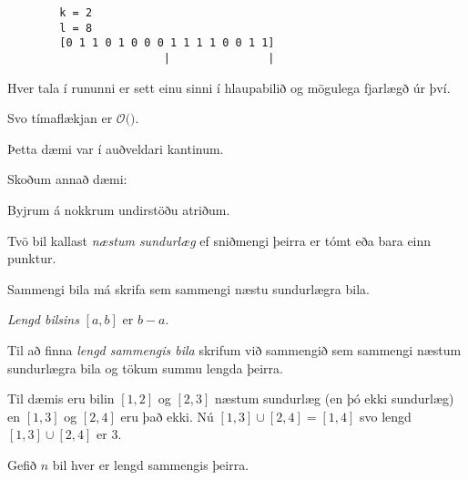 { \begin{verbatim}
        k = 2
        l = 8
        [0 1 1 0 1 0 0 0 1 1 1 1 0 0 1 1]
                        |               |
\end{verbatim} }

{
	\only<all:1>{\hbilA}
	\only<all:2>{\hbilB}
	\only<all:3>{\hbilC}
	\only<all:4>{\hbilD}
	\only<all:5>{\hbilE}
	\only<all:6>{\hbilF}
	\only<all:7>{\hbilG}
	\only<all:8>{\hbilH}
	\only<all:9>{\hbilI}
	\only<all:10>{\hbilJ}
	\only<all:11>{\hbilK}
	\only<all:12>{\hbilL}
	\only<all:13>{\hbilM}
	\only<all:14>{\hbilN}
	\only<all:15>{\hbilO}
	\only<all:16>{\hbilP}
	\only<all:17>{\hbilQ}
	\only<all:18>{\hbilR}
	\only<all:19>{\hbilS}
	\only<all:20>{\hbilT}
	\only<all:21>{\hbilU}
	\only<all:22>{\hbilV}
	\only<all:23>{\hbilW}
	\only<all:24>{\hbilX}
	\only<all:25>{\hbilY}
}

{
}

{
	{
		\item<1-> Hver tala í rununni er sett einu sinni í hlaupabilið og mögulega fjarlægð úr því.
		\item<2-> Svo tímaflækjan er $\mathcal{O}($\onslide<3->{$\,n\,$}$)$.
	}
}

{
	{
		\item<1-> Þetta dæmi var í auðveldari kantinum.
		\item<2-> Skoðum annað dæmi:
		\item<3-> Byjrum á nokkrum undirstöðu atriðum.
		\item<4-> Tvö bil kallast \emph{næstum sundurlæg} ef sniðmengi þeirra er tómt eða bara einn punktur.
		\item<5-> Sammengi bila má skrifa sem sammengi næstu sundurlægra bila.
		\item<6-> \emph{Lengd bilsins} $[a, b]$ er $b - a$.
		\item<7-> Til að finna \emph{lengd sammengis bila} skrifum við sammengið sem sammengi næstum sundurlægra bila
			og tökum summu lengda þeirra.
		\item<8-> Til dæmis eru bilin $[1, 2]$ og $[2, 3]$ næstum sundurlæg (en þó ekki sundurlæg) en 
			$[1, 3]$ og $[2, 4]$ eru það ekki. Nú $[1, 3] \cup [2, 4] = [1, 4]$ svo lengd 
			$[1, 3] \cup [2, 4]$ er $3$.
	}
}

{
	{
		\item<1-> Gefið $n$ bil hver er lengd sammengis þeirra.
	}
}

